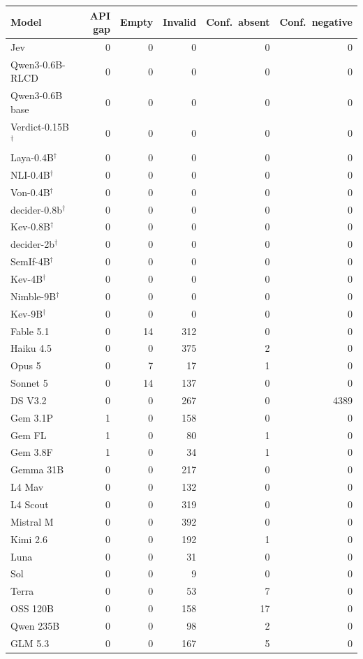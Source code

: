 \begin{tabular}{lrrrrr}
\toprule
Model & API gap & Empty & Invalid & Conf.\ absent & Conf.\ negative \\
\midrule
Jev & 0 & 0 & 0 & 0 & 0 \\
Qwen3-0.6B-RLCD & 0 & 0 & 0 & 0 & 0 \\
Qwen3-0.6B base & 0 & 0 & 0 & 0 & 0 \\
Verdict-0.15B$^{\dagger}$ & 0 & 0 & 0 & 0 & 0 \\
Laya-0.4B$^{\dagger}$ & 0 & 0 & 0 & 0 & 0 \\
NLI-0.4B$^{\dagger}$ & 0 & 0 & 0 & 0 & 0 \\
Von-0.4B$^{\dagger}$ & 0 & 0 & 0 & 0 & 0 \\
decider-0.8b$^{\dagger}$ & 0 & 0 & 0 & 0 & 0 \\
Kev-0.8B$^{\dagger}$ & 0 & 0 & 0 & 0 & 0 \\
decider-2b$^{\dagger}$ & 0 & 0 & 0 & 0 & 0 \\
SemIf-4B$^{\dagger}$ & 0 & 0 & 0 & 0 & 0 \\
Kev-4B$^{\dagger}$ & 0 & 0 & 0 & 0 & 0 \\
Nimble-9B$^{\dagger}$ & 0 & 0 & 0 & 0 & 0 \\
Kev-9B$^{\dagger}$ & 0 & 0 & 0 & 0 & 0 \\
Fable 5.1 & 0 & 14 & 312 & 0 & 0 \\
Haiku 4.5 & 0 & 0 & 375 & 2 & 0 \\
Opus 5 & 0 & 7 & 17 & 1 & 0 \\
Sonnet 5 & 0 & 14 & 137 & 0 & 0 \\
DS V3.2 & 0 & 0 & 267 & 0 & 4389 \\
Gem 3.1P & 1 & 0 & 158 & 0 & 0 \\
Gem FL & 1 & 0 & 80 & 1 & 0 \\
Gem 3.8F & 1 & 0 & 34 & 1 & 0 \\
Gemma 31B & 0 & 0 & 217 & 0 & 0 \\
L4 Mav & 0 & 0 & 132 & 0 & 0 \\
L4 Scout & 0 & 0 & 319 & 0 & 0 \\
Mistral M & 0 & 0 & 392 & 0 & 0 \\
Kimi 2.6 & 0 & 0 & 192 & 1 & 0 \\
Luna & 0 & 0 & 31 & 0 & 0 \\
Sol & 0 & 0 & 9 & 0 & 0 \\
Terra & 0 & 0 & 53 & 7 & 0 \\
OSS 120B & 0 & 0 & 158 & 17 & 0 \\
Qwen 235B & 0 & 0 & 98 & 2 & 0 \\
GLM 5.3 & 0 & 0 & 167 & 5 & 0 \\
\bottomrule
\end{tabular}
